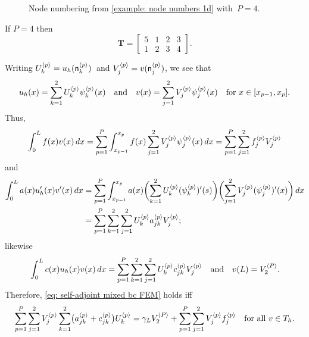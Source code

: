 \begin{figure}
\caption{Node numbering from \cref{example: node numbers 1d} with~$P=4$.}
\begin{center}
\end{center}
\end{figure}

\begin{example}\label{example: node numbers 1d}
If $P=4$ then
\[
\boldsymbol{T}=\begin{bmatrix}
5&1&2&3\\
1&2&3&4\end{bmatrix}.
\]
\end{example}

Writing $U^{\langle p\rangle}_k=u_h(\mathsf{n}^{\langle p\rangle}_k)$~and
$V^{\langle p\rangle}_j=v(\mathsf{n}^{\langle p\rangle}_j)$, we see that
\[
u_h(x)=\sum_{k=1}^2U^{\langle p\rangle}_k\psi^{\langle p\rangle}_k(x)
\quad\text{and}\quad
v(x)=\sum_{j=1}^2V^{\langle p\rangle}_j\psi^{\langle p\rangle}_j(x)
\quad\text{for $x\in[x_{p-1},x_p]$.}
\]
Thus,
\[
\int_0^Lf(x)v(x)\,dx=\sum_{p=1}^P\int_{x_{p-1}}^{x_p}f(x)\sum_{j=1}^2
    V^{\langle p\rangle}_j\psi^{\langle p\rangle}_j(x)\,dx
    =\sum_{p=1}^P\sum_{j=1}^2 f^{\langle p\rangle}_jV_j^{\langle p\rangle}
\]
and
\begin{align*}
\int_0^La(x)u_h'(x)v'(x)\,dx
    &=\sum_{p=1}^P\int_{x_{p-1}}^{x_p}a(x)
    \biggl(\sum_{k=1}^2 U^{\langle p\rangle}_k(\psi_k^{\langle p\rangle})'(s)\biggr)
    \biggl(\sum_{j=1}^2 V^{\langle p\rangle}_j(\psi_j^{\langle p\rangle})'(x)\biggr)\,dx\\
    &=\sum_{p=1}^P\sum_{k=1}^2\sum_{j=1}^2
    U^{\langle p\rangle}_ka^{\langle p\rangle}_{jk}V^{\langle p\rangle}_j;
\end{align*}
likewise
\[
\int_0^Lc(x)u_h(x)v(x)\,dx=\sum_{p=1}^P\sum_{k=1}^2\sum_{j=1}^2
    U^{\langle p\rangle}_kc^{\langle p\rangle}_{jk}V^{\langle p\rangle}_j
\quad\text{and}\quad
v(L)=V^{\langle P\rangle}_2.
\]
Therefore, \eqref{eq: self-adjoint mixed bc FEM} holds iff
\[
\sum_{p=1}^P\sum_{j=1}^2V^{\langle p\rangle}_j
\sum_{k=1}^2\bigl(a^{\langle p\rangle}_{jk}+c^{\langle p\rangle}_{jk}\bigr)U^{\langle p\rangle}_k
    =\gamma_LV^{\langle P\rangle}_2+\sum_{p=1}^P\sum_{j=1}^2V^{\langle p\rangle}_jf^{\langle p\rangle}_j
    \quad\text{for all $v\in T_h$.}
\]

